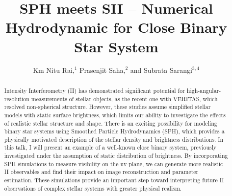 \documentclass[twocolumn]{emulateapj}
\begin{document}
	
	\title{SPH meets SII -- Numerical Hydrodynamic for Close Binary Star System}
	
	\author{Km Nitu Rai,$^{1}$ Prasenjit Saha,$^{2}$ and Subrata Sarangi$^{3,4}$}
	
	
	
	

\begin{abstract}
Intensity Interferometry (II) has demonstrated significant potential for high-angular-resolution measurements of stellar objects, as the recent one with VERITAS, which resolved non-spherical structure. However, these studies assume simplified stellar models with static surface brightness, which limits our ability to investigate the effects of realistic stellar structure and shape.
There is an exciting possibility for modeling binary star systems using Smoothed Particle Hydrodynamics (SPH), which provides a physically motivated description of the stellar density and brightness distributions. In this talk, I will present an example of a well-known close binary system, previously investigated under the assumption of static distribution of brightness. By incorporating SPH simulations to measure visibility on the uv-plane, we can generate more realistic II observables and find their impact on image reconstruction and parameter estimation. These simulations provide an important step toward interpreting future II observations of complex stellar systems with greater physical realism.
\end{abstract}

\maketitle
\end{document}

